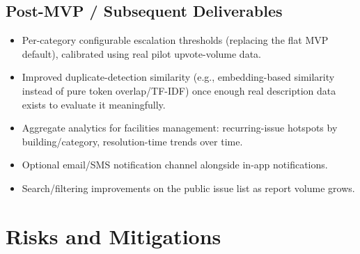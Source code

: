 \documentclass[11pt,a4paper]{article}
\begin{document}
\subsection{Post-MVP / Subsequent Deliverables}
\begin{itemize}[leftmargin=0.7cm]
  \item Per-category configurable escalation thresholds (replacing the
    flat MVP default), calibrated using real pilot upvote-volume data.
  \item Improved duplicate-detection similarity (e.g., embedding-based
    similarity instead of pure token overlap/TF-IDF) once enough real
    description data exists to evaluate it meaningfully.
  \item Aggregate analytics for facilities management: recurring-issue
    hotspots by building/category, resolution-time trends over time.
  \item Optional email/SMS notification channel alongside in-app
    notifications.
  \item Search/filtering improvements on the public issue list as
    report volume grows.
\end{itemize}



\section{Risks and Mitigations}
\end{document}
